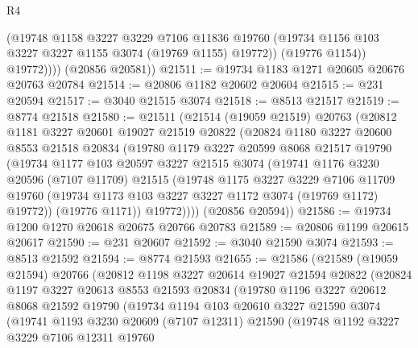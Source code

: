 \begin{lexlean}{R4}
\begin{coremodule}
                (@19748
                  @1158
                  @3227
                  @3229
                  @7106
                  @11836
                  @19760
                  (@19734 @1156 @103 @3227 @3227 @1155 @3074 (@19769 @1155) @19772))
                (@19776 @1154))
              @19772))))
      (@20856 @20581))
@21511 := @19734 @1183 @1271 @20605 @20676 @20763 @20784
@21514 := @20806 @1182 @20602 @20604
@21515 := @231 @20594
@21517 := @3040 @21515 @3074
@21518 := @8513 @21517
@21519 := @8774 @21518
@21580 := @21511
    (@21514
      (@19059 @21519)
      @20763
      (@20812
        @1181
        @3227
        @20601
        @19027
        @21519
        @20822
        (@20824
          @1180
          @3227
          @20600
          @8553
          @21518
          @20834
          (@19780
            @1179
            @3227
            @20599
            @8068
            @21517
            @19790
            (@19734
              @1177
              @103
              @20597
              @3227
              @21515
              @3074
              (@19741
                @1176
                @3230
                @20596
                (@7107 @11709)
                @21515
                (@19748
                  @1175
                  @3227
                  @3229
                  @7106
                  @11709
                  @19760
                  (@19734 @1173 @103 @3227 @3227 @1172 @3074 (@19769 @1172) @19772))
                (@19776 @1171))
              @19772))))
      (@20856 @20594))
@21586 := @19734 @1200 @1270 @20618 @20675 @20766 @20783
@21589 := @20806 @1199 @20615 @20617
@21590 := @231 @20607
@21592 := @3040 @21590 @3074
@21593 := @8513 @21592
@21594 := @8774 @21593
@21655 := @21586
    (@21589
      (@19059 @21594)
      @20766
      (@20812
        @1198
        @3227
        @20614
        @19027
        @21594
        @20822
        (@20824
          @1197
          @3227
          @20613
          @8553
          @21593
          @20834
          (@19780
            @1196
            @3227
            @20612
            @8068
            @21592
            @19790
            (@19734
              @1194
              @103
              @20610
              @3227
              @21590
              @3074
              (@19741
                @1193
                @3230
                @20609
                (@7107 @12311)
                @21590
                (@19748
                  @1192
                  @3227
                  @3229
                  @7106
                  @12311
                  @19760

\end{coremodule}
\end{lexlean}
